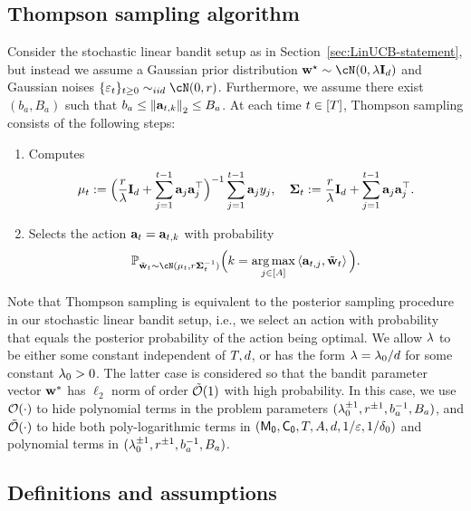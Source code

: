 \subsection{Thompson sampling algorithm}\label{app:ts_algorithm_formula}
Consider the stochastic linear bandit setup as in Section~\ref{sec:LinUCB-statement}, but instead we assume a  Gaussian prior distribution $\bw^\star\sim \cN(0,\Tpspar\id_d)$ and Gaussian noises $\{ \eps_t \}_{t \ge 0} \sim_{iid} \cN(0,\Tpsparn)$. Furthermore, we assume there exist $(b_a, B_a)$ such that $b_a\leq\left\|{{\mathbf a}_{t,k}}\right\|_2\leq B_a$. At each time $t\in[{T}]$, Thompson sampling consists of the following steps:
\begin{enumerate}
    \item Computes 
    \[
    {{\mathbf\mu}}_t:= \Big(\frac{{r}}{{\lambda}  }{\mathbf I}_{d}+\sum_{j=1}^{t-1}{\mathbf a}_j{\mathbf a}_j^\top \Big)^{-1}\sum_{j=1}^{t-1}{\mathbf a}_j y_j,~~~
{{\mathbf\Sigma}}_t:=\frac{{r}}{{\lambda}  }{\mathbf I}_{d}+\sum_{j=1}^{t-1}{\mathbf a}_j{\mathbf a}_j^\top.
\]
\item Selects the action ${\mathbf a}_{t}={\mathbf a}_{t,k}$ with probability 
\[
\P_{\Tpssam_t\sim\cN(\Tpsmean_t,\Tpsparn\Tpscov_t^{-1})}\Big(k =\argmax_{j \in[A]}\<\ba_{t,j},\Tpssam_t\> \Big). 
\]
\end{enumerate}

Note that Thompson sampling is equivalent to the posterior sampling procedure in our stochastic linear bandit setup, i.e., we select an action with probability that equals  the posterior probability of the action being optimal.  We allow ${\lambda}$ to be either some constant independent of ${T},d$,  or has the form ${\lambda}={\lambda}_0/d$ for some constant ${\lambda}_0>0$.  The latter case is considered so that the bandit parameter vector ${\mathbf w}^*$ has $\ell_2$ norm of order  ${\tilde{\mathcal O}}(1)$ with high probability. In this case, we use $\mathcal{O}(\cdot)$ to hide polynomial terms in the problem parameters $(\lambda_0^{\pm1},{r}^{\pm1},b_a^{-1},B_a)$, and ${\tilde{\mathcal O}}(\cdot)$ to hide both poly-logarithmic terms in $({\mathsf{M_0}},{{\mathsf{C_0}}},T,A,d,1/\varepsilon,1/\delta_0)$ and polynomial terms in  $(\lambda_0^{\pm1},{r}^{\pm1},b_a^{-1},B_a)$. 




\subsection{Definitions and assumptions}\label{app:thompson_def_ass}




